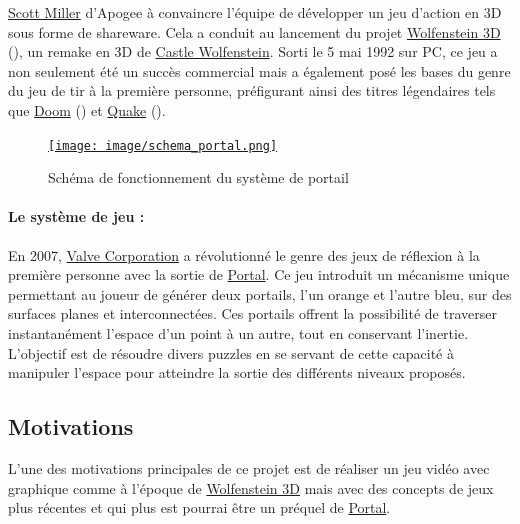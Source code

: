 \documentclass[11pt]{article}
\begin{document}
\href{https://fr.wikipedia.org/wiki/Scott_Miller_(programmeur)}{Scott Miller}\cite{Scott_Miller} d'Apogee à convaincre l'équipe de 
développer un jeu d'action en 3D sous forme de shareware. Cela a conduit au lancement du projet 
\href{https://fr.wikipedia.org/wiki/Wolfenstein_3D}{Wolfenstein 3D}\cite{Wolfenstein3D} (), un remake en 3D de 
\href{https://fr.wikipedia.org/wiki/Castle_Wolfenstein}{Castle Wolfenstein}\cite{Castle_Wolfenstein}. Sorti le 5 mai 1992 sur PC, ce jeu a 
non seulement été un succès commercial mais a également posé les bases du genre du jeu de tir à la première personne, 
préfigurant ainsi des titres légendaires tels que 
\href{https://fr.wikipedia.org/wiki/Doom_(jeu_vid%C3%A9o,_1993)}{Doom}\cite{Doom_1993} (\nameref{fig:doom_1993}) et 
\href{https://fr.wikipedia.org/wiki/Quake}{Quake}\cite{Quake} ().

\begin{figure}
	\centering
	\href{https://fr.wikipedia.org/wiki/Portal_(jeu_vid%C3%A9o)}{\texttt{[image: image/schema\_portal.png]}}
	\hspace*{-0.5cm}
	\caption{Schéma de fonctionnement du système de portail}
	\label{fig:schema_portal}
\end{figure}

\paragraph{Le système de jeu : }
En 2007, \href{https://fr.wikipedia.org/wiki/Valve_Corporation}{Valve Corporation}\cite{Valve_Corporation} a révolutionné le genre des jeux 
de réflexion à la première personne avec la sortie de 
\href{https://fr.wikipedia.org/wiki/Portal_(jeu_vid%C3%A9o)}{Portal}\cite{Portal}. Ce jeu introduit un mécanisme unique 
permettant au joueur de générer deux portails, l'un orange et l'autre bleu, sur des surfaces planes et 
interconnectées. Ces portails offrent la possibilité de traverser instantanément l'espace d'un point à un autre, 
tout en conservant l'inertie. L'objectif est de résoudre divers puzzles en se servant de cette capacité à manipuler 
l'espace pour atteindre la sortie des différents niveaux proposés.



\subsection{Motivations}


L'une des motivations principales de ce projet est de réaliser un jeu vidéo
avec graphique comme à l'époque de \href{https://fr.wikipedia.org/wiki/Wolfenstein_3D}{Wolfenstein 3D}\cite{Wolfenstein3D}
mais avec des concepts de jeux plus récentes et qui plus est pourrai être
un préquel de \href{https://fr.wikipedia.org/wiki/Portal_(jeu_vid%C3%A9o)}{Portal}\cite{Portal}.
\end{document}
